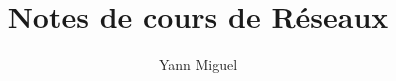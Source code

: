 \documentclass[12pt, a4paper]{article}
\title{Notes de cours de Réseaux}
\author{Yann Miguel}
\begin{document}
\ttfamily
\maketitle
\tableofcontents
\newpage







\end{document}
